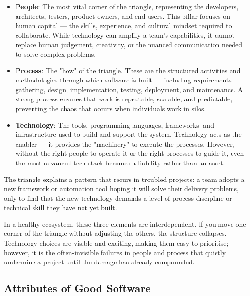 \documentclass[11pt,a4paper]{book}
\begin{document}
\begin{itemize}
  \item \textbf{People}: The most vital corner of the triangle, representing the developers, architects, testers, product owners, and end-users. This pillar focuses on human capital --- the skills, experience, and cultural mindset required to collaborate. While technology can amplify a team's capabilities, it cannot replace human judgement, creativity, or the nuanced communication needed to solve complex problems.
\end{itemize}

\begin{itemize}
  \item \textbf{Process}: The "how" of the triangle. These are the structured activities and methodologies through which software is built --- including requirements gathering, design, implementation, testing, deployment, and maintenance. A strong process ensures that work is repeatable, scalable, and predictable, preventing the chaos that occurs when individuals work in silos.
\end{itemize}

\begin{itemize}
  \item \textbf{Technology}: The tools, programming languages, frameworks, and infrastructure used to build and support the system. Technology acts as the enabler --- it provides the "machinery" to execute the processes. However, without the right people to operate it or the right processes to guide it, even the most advanced tech stack becomes a liability rather than an asset.
\end{itemize}

The triangle explains a pattern that recurs in troubled projects: a team adopts a new framework or automation tool hoping it will solve their delivery problems, only to find that the new technology demands a level of process discipline or technical skill they have not yet built.

In a healthy ecosystem, these three elements are interdependent. If you move one corner of the triangle without adjusting the others, the structure collapses. Technology choices are visible and exciting, making them easy to prioritise; however, it is the often-invisible failures in people and process that quietly undermine a project until the damage has already compounded.

\subsection{Attributes of Good Software}
\end{document}
